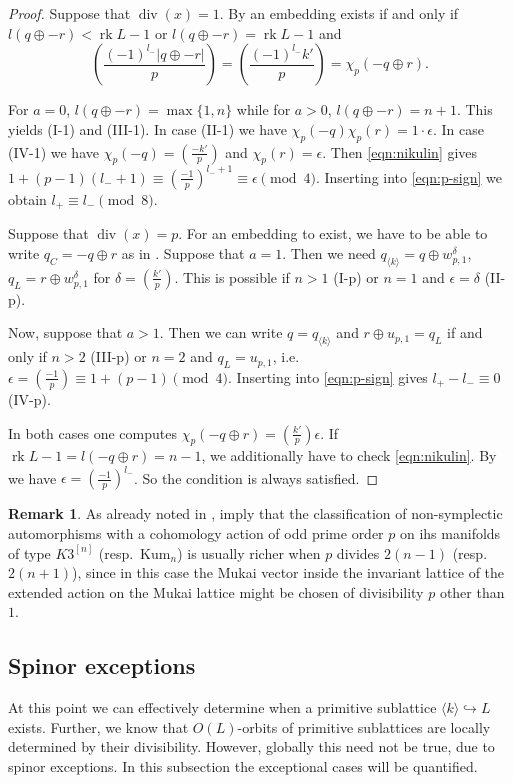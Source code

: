 \documentclass{amsart}
\theoremstyle{definition}
\newtheorem{remark}[definition]{Remark}
\theoremstyle{plain}
\DeclareMathOperator{\rk}{rk}
\newcommand{\leg}[2]{\left( \frac{#1}{#2}\right)}
\newcommand{\kumn}{\mathrm{Kum}_n}
\newcommand{\hskn}{K3^{\left[n\right]}}
\renewcommand{\div}{\mathop{div}}
\begin{document}
\begin{proof}
Suppose that $\div(x) =1$.
By \cite[Thm.\ 1.12.2]{nikulin} an embedding exists if and only if
$l(q \oplus -r) < \rk L - 1$  or
$l(q \oplus -r) = \rk L - 1$ and
\begin{equation}\label{eqn:nikulin}
\leg{(-1)^{l_-}|q \oplus -r|}{p} = \leg{(-1)^{l_-} k'}{p}= \chi_p(-q \oplus r).
\end{equation}

For $a=0$, $l(q\oplus -r)=\max\{1,n\}$ while for $a>0$, $l(q\oplus -r)=n+1$. This yields (I-1) and (III-1).
In case (II-1) we have $\chi_p(-q)\chi_p(r)=1\cdot \epsilon$.
In case (IV-1) we have $\chi_p(-q) = \leg{-k'}{p}$ and
$\chi_p(r)=\epsilon$.
Then \cref{eqn:nikulin}
gives $1+(p-1)(l_-+1) \equiv \leg{-1}{p}^{l_-+1}\equiv\epsilon \pmod 4$. Inserting into \cref{eqn:p-sign} we obtain $l_+ \equiv l_- \pmod 8$.

Suppose that $\div(x) = p$. For an embedding to exist, we have to be able to write
$q_C= -q \oplus r$ as in .
Suppose that $a=1$. Then we need
$q_{\langle k \rangle} = q \oplus w_{p,1}^{\delta}$,
$q_L = r \oplus w_{p,1}^{\delta}$ for
$\delta = \leg{k'}{p}$. This is possible if $n> 1$ (I-p) or $n=1$ and $\epsilon=\delta$ (II-p).

Now, suppose that $a>1$. Then we can write $q=q_{\langle k \rangle}$ and $r \oplus u_{p,1} = q_L$ if and only if
$n>2$ (III-p) or $n=2$ and $q_L=u_{p,1}$, i.e.\ $\epsilon = \leg{-1}{p}\equiv 1 + (p-1) \pmod 4$. Inserting into \cref{eqn:p-sign} gives $l_+ - l_- \equiv 0$ (IV-p).

In both cases one computes $\chi_p(-q \oplus r)=\leg{k'}{p}\epsilon$.
If $\rk L - 1 = l(-q \oplus r)= n-1$, we additionally have to check  \cref{eqn:nikulin}.
By  we have $\epsilon = \leg{-1}{p}^{l_-}$. So the condition is always satisfied.
\end{proof}


\begin{remark}
As already noted in \cite{CC},  imply that the classification of non-symplectic automorphisms with a cohomology action of odd prime order $p$ on ihs manifolds of type $\hskn$ (resp.\ $\kumn$) is usually richer when $p$ divides $2(n-1)$ (resp.\ $2(n+1)$), since in this case the Mukai vector inside the invariant lattice of the extended action on the Mukai lattice might be chosen of divisibility $p$ other than $1$.
\end{remark}

\subsection{Spinor exceptions}\label{subs: spinor}
At this point we can effectively determine when a primitive sublattice $\langle k \rangle \hookrightarrow L$ exists.
Further, we know that $O(L)$-orbits of primitive sublattices
are locally determined by their divisibility. However, globally
this need not be true, due to spinor exceptions.
In this subsection the exceptional cases will be quantified.
\end{document}
